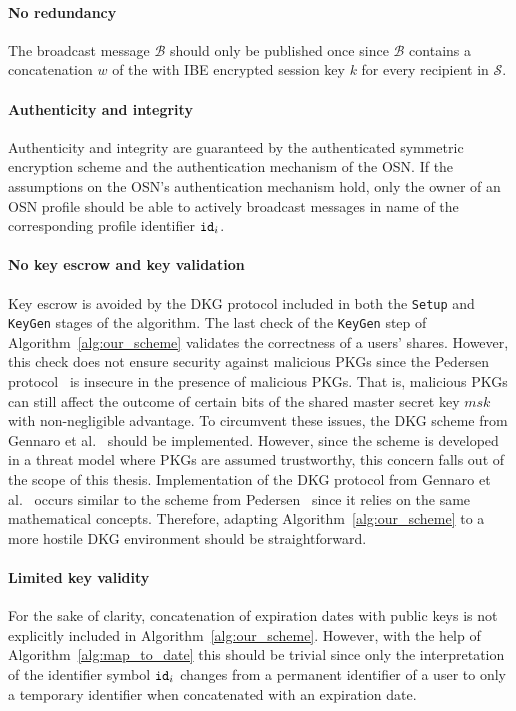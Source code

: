 \paragraph{No redundancy} The broadcast message $\mathcal{B}$ should only be published once since $\mathcal{B}$ contains a concatenation $w$ of the with IBE encrypted session key $k$ for every recipient in $\mathcal{S}$.

\paragraph{Authenticity and integrity} Authenticity and integrity are guaranteed by the authenticated symmetric encryption scheme and the authentication mechanism of the OSN. If the assumptions on the OSN's authentication mechanism hold, only the owner of an OSN profile should be able to actively broadcast messages in name of the corresponding profile identifier $\mathtt{id}_{i}$.

\paragraph{No key escrow and key validation} Key escrow is avoided by the DKG protocol included in both the \texttt{Setup} and \texttt{KeyGen} stages of the algorithm. 
The last check of the \texttt{KeyGen} step of Algorithm~\ref{alg:our_scheme} validates the correctness of a users' shares. However, this check does not ensure security against malicious PKGs since the Pedersen protocol~\cite{art:Pedersen91a} is insecure in the presence of malicious PKGs. That is, malicious PKGs can still affect the outcome of certain bits of the shared master secret key $msk$ with non-negligible advantage. To circumvent these issues, the DKG scheme from Gennaro et al.~\cite{art:GennaroJKR07} should be implemented. However, since the scheme is developed in a threat model where PKGs are assumed trustworthy, this concern falls out of the scope of this thesis. Implementation of the DKG protocol from Gennaro et al.~\cite{art:GennaroJKR07} occurs similar to the scheme from Pedersen~\cite{art:Pedersen91a} since it relies on the same mathematical concepts. Therefore, adapting Algorithm~\ref{alg:our_scheme} to a more hostile DKG environment should be straightforward.

\paragraph{Limited key validity} For the sake of clarity, concatenation of expiration dates with public keys is not explicitly included in Algorithm~\ref{alg:our_scheme}. However, with the help of Algorithm~\ref{alg:map_to_date} this should be trivial since only the interpretation of the identifier symbol $\mathtt{id}_{i}$ changes from a permanent identifier of a user to only a temporary identifier when concatenated with an expiration date.

